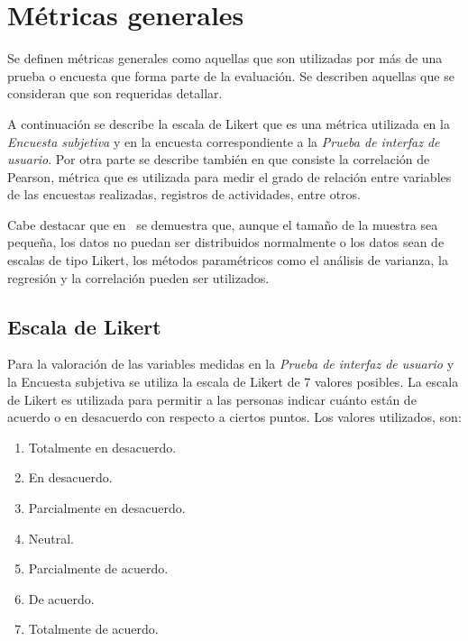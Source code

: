 
\section{Métricas generales}

Se definen métricas generales como aquellas que son utilizadas por más de una
prueba o encuesta que forma parte de la evaluación. Se describen aquellas que se
consideran que son requeridas detallar.

A continuación se describe la escala de Likert que es una métrica utilizada en
la \emph{Encuesta subjetiva} y en la encuesta correspondiente a la \emph{Prueba
    de interfaz de usuario}. Por otra parte se describe también en que consiste
la correlación de Pearson, métrica que es utilizada para medir el grado de
relación entre variables de las encuestas realizadas, registros de actividades,
entre otros.


Cabe destacar que en~\cite{norman2010likert} se demuestra que, aunque el tamaño
de la muestra sea pequeña, los datos no puedan ser distribuidos normalmente o
los datos sean de escalas de tipo Likert, los métodos paramétricos como el
análisis de varianza, la regresión y la correlación pueden ser utilizados.


\subsection{Escala de Likert}
\label{sec:likert}

Para la valoración de las variables medidas en la \emph{Prueba de interfaz de
    usuario} y la {Encuesta subjetiva} se utiliza la escala de
Likert\cite{Allen:2007} de 7 valores posibles. La escala de Likert es utilizada
para permitir a las personas indicar cuánto están de acuerdo o en desacuerdo con
respecto a ciertos puntos. Los valores utilizados, son:

\begin{enumerate}
    \item Totalmente en desacuerdo.
    \item En desacuerdo.
    \item Parcialmente en desacuerdo.
    \item Neutral.
    \item Parcialmente de acuerdo.
    \item De acuerdo.
    \item Totalmente de acuerdo.
\end{enumerate}

